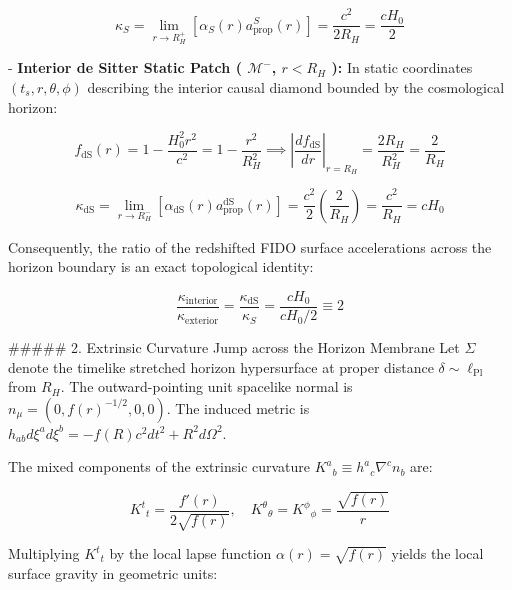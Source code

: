 \documentclass[11pt,a4paper]{article}
\theoremstyle{definition}
\theoremstyle{remark}
\begin{document}
\begin{equation}
\kappa_S = \lim_{r \to R_H^+} \left[ \alpha_S(r) a_{\text{prop}}^S(r) \right] = \frac{c^2}{2 R_H} = \frac{c H_0}{2}
\end{equation}


- \textbf{Interior de Sitter Static Patch ( $\mathcal{M}^-$, $r < R_H$ ):}
In static coordinates $(t_s, r, \theta, \phi)$ describing the interior causal diamond bounded by the cosmological horizon:


\begin{equation}
f_{\text{dS}}(r) = 1 - \frac{H_0^2 r^2}{c^2} = 1 - \frac{r^2}{R_H^2} \implies \left| \frac{df_{\text{dS}}}{dr} \right|_{r = R_H} = \frac{2 R_H}{R_H^2} = \frac{2}{R_H}
\end{equation}



\begin{equation}
\kappa_{\text{dS}} = \lim_{r \to R_H^-} \left[ \alpha_{\text{dS}}(r) a_{\text{prop}}^{\text{dS}}(r) \right] = \frac{c^2}{2} \left(\frac{2}{R_H}\right) = \frac{c^2}{R_H} = c H_0
\end{equation}


Consequently, the ratio of the redshifted FIDO surface accelerations across the horizon boundary is an exact topological identity:


\begin{equation}
\frac{\kappa_{\text{interior}}}{\kappa_{\text{exterior}}} = \frac{\kappa_{\text{dS}}}{\kappa_S} = \frac{c H_0}{c H_0 / 2} \equiv 2
\end{equation}


\#\#\#\#\# 2. Extrinsic Curvature Jump across the Horizon Membrane
Let $\Sigma$ denote the timelike stretched horizon hypersurface at proper distance $\delta \sim \ell_{\text{Pl}}$ from $R_H$. The outward-pointing unit spacelike normal is $n_\mu = (0, f(r)^{-1/2}, 0, 0)$. The induced metric is $h_{ab} d\xi^a d\xi^b = -f(R) c^2 dt^2 + R^2 d\Omega^2$.

The mixed components of the extrinsic curvature $K^a{}_b \equiv h^a{}_c \nabla^c n_b$ are:


\begin{equation}
K^t{}_t = \frac{f'(r)}{2\sqrt{f(r)}}, \quad K^\theta{}_\theta = K^\phi{}_\phi = \frac{\sqrt{f(r)}}{r}
\end{equation}


Multiplying $K^t{}_t$ by the local lapse function $\alpha(r) = \sqrt{f(r)}$ yields the local surface gravity in geometric units:
\end{document}
